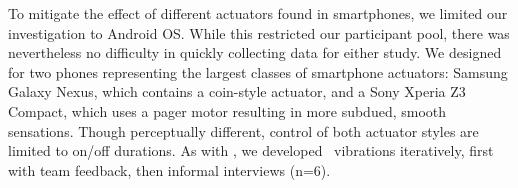 To mitigate the effect of different actuators found in smartphones, we limited our investigation to Android OS.
While this restricted our participant pool, there was nevertheless no difficulty in  quickly collecting data for either study.
We designed for two phones representing the largest classes of smartphone actuators: Samsung Galaxy Nexus, which contains a coin-style actuator, and a Sony Xperia Z3 Compact, which uses a pager motor resulting in more subdued, smooth sensations.
Though perceptually different, control of both actuator styles are limited to on/off durations.
As with \linear, we developed \lofi~vibrations iteratively, first with team feedback, then informal interviews (n=6).




